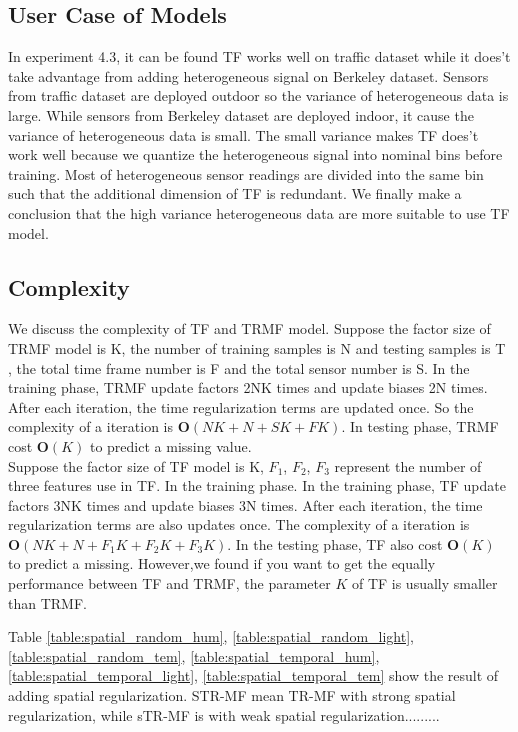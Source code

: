 \subsection{User Case of Models}


In experiment 4.3, it can be found TF works well on traffic dataset while it does't take advantage from adding heterogeneous signal on Berkeley dataset.
Sensors from traffic dataset are deployed outdoor so the variance of heterogeneous data is large.
While sensors from Berkeley dataset are deployed indoor, it cause the variance of heterogeneous data is small.
The small variance makes TF does't work well because we quantize the heterogeneous signal into nominal bins before training.
Most of heterogeneous sensor readings are divided into the same bin such that the additional dimension of TF is redundant.
We finally make a conclusion that the high variance heterogeneous data are more suitable to use TF model.

\subsection{Complexity}
We discuss the complexity of TF and TRMF model. Suppose the factor size of TRMF model is K, the number of training samples is N and testing samples is T , the total time frame number is F and the total sensor number is S. In the training phase, TRMF update factors 2NK times and update biases 2N times. After each iteration, the time regularization terms are updated once. So the complexity of a iteration is $\mathbf{O}(NK+N+SK+FK)$. In testing phase, TRMF cost  
$\mathbf{O}(K)$ to predict a missing value.\\
Suppose the factor size of TF model is K, $F_1$, $F_2$, $F_3$ represent the number of three features use in TF. In the training phase. In the training phase, TF update factors 3NK times and update biases 3N times. After each iteration, the time regularization terms are also updates once. The complexity of a iteration is $\mathbf{O}(NK+N+F_1K+F_2K+F_3K)$. In the testing phase, TF also cost  $\mathbf{O}(K)$ to predict a missing. However,we found if you want to get the equally performance between TF and TRMF, the parameter $K$ of TF is usually smaller than TRMF.



Table \ref{table:spatial_random_hum}, \ref{table:spatial_random_light}, \ref{table:spatial_random_tem}, \ref{table:spatial_temporal_hum}, \ref{table:spatial_temporal_light}, \ref{table:spatial_temporal_tem}  show the result of adding spatial regularization. STR-MF mean TR-MF with strong spatial regularization, while sTR-MF is with weak spatial regularization.........

